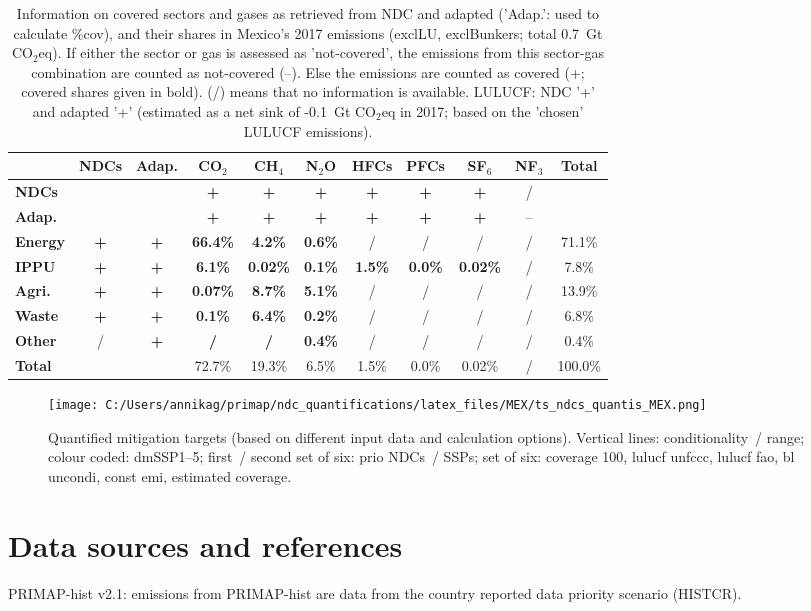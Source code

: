 \documentclass[12pt]{article}
\begin{document}
 \begin{table}[htbp]\small
 \centering
 \caption{Information on covered sectors and gases as retrieved from NDC and adapted ('Adap.': used to calculate \%cov), and their shares in Mexico's 2017 emissions (exclLU, exclBunkers; total 0.7~Gt CO$_2$eq).
 If either the sector or gas is assessed as 'not-covered', the emissions from this sector-gas combination are counted as not-covered (--). 
 Else the emissions are counted as covered (+; covered shares given in bold).
 (/) means that no information is available.
 LULUCF: NDC '+' and adapted '+' (estimated as a net sink of -0.1~Gt CO$_2$eq in 2017; based on the 'chosen' LULUCF emissions).}
 \label{tab:coveredSectorsGases}
 \begin{tabular}{l || c c || c c c c c c c | c}
 \bfseries  & \bfseries NDCs & \bfseries Adap. & \bfseries CO$_2$ & \bfseries CH$_4$ & \bfseries N$_2$O & \bfseries HFCs & \bfseries PFCs & \bfseries SF$_6$ & \bfseries NF$_3$ & \bfseries Total \tabularnewline \hline \hline
 \bfseries NDCs &  &  & \bfseries + & \bfseries + & \bfseries + & \bfseries + & \bfseries + & \bfseries + & / &  \tabularnewline 
 \bfseries Adap. &  &  & \bfseries + & \bfseries + & \bfseries + & \bfseries + & \bfseries + & \bfseries + & -- &  \tabularnewline \hline \hline
 \bfseries Energy & \bfseries + & \bfseries + & \bfseries 66.4\% & \bfseries 4.2\% & \bfseries 0.6\% & / & / & / & / & 71.1\% \tabularnewline 
 \bfseries IPPU & \bfseries + & \bfseries + & \bfseries 6.1\% & \bfseries 0.02\% & \bfseries 0.1\% & \bfseries 1.5\% & \bfseries 0.0\% & \bfseries 0.02\% & / & 7.8\% \tabularnewline 
 \bfseries Agri. & \bfseries + & \bfseries + & \bfseries 0.07\% & \bfseries 8.7\% & \bfseries 5.1\% & / & / & / & / & 13.9\% \tabularnewline 
 \bfseries Waste & \bfseries + & \bfseries + & \bfseries 0.1\% & \bfseries 6.4\% & \bfseries 0.2\% & / & / & / & / & 6.8\% \tabularnewline 
 \bfseries Other & / & \bfseries + & \bfseries / & \bfseries / & \bfseries 0.4\% & / & / & / & / & 0.4\% \tabularnewline \hline
 \bfseries Total &  &  & 72.7\% & 19.3\% & 6.5\% & 1.5\% & 0.0\% & 0.02\% & / & 100.0\% \tabularnewline 
 \end{tabular}
 \end{table}
 \begin{figure}[htbp]
 \centering
 \texttt{[image: C:/Users/annikag/primap/ndc\_quantifications/latex\_files/MEX/ts\_ndcs\_quantis\_MEX.png]}
 \caption{Quantified mitigation targets (based on different input data and calculation options).
 Vertical lines: conditionality~/ range;
 colour coded: dmSSP1--5;
 first~/ second set of six: prio NDCs~/ SSPs;
 set of six: coverage 100, lulucf unfccc, lulucf fao, bl uncondi, const emi, estimated coverage.}
 \label{fig:miti}
 \end{figure}

 \section{Data sources and references}
 \label{sec:dataSourcesRefs}
 PRIMAP-hist v2.1: emissions from PRIMAP-hist are data from the country reported data priority scenario (HISTCR).

 
\end{document}
